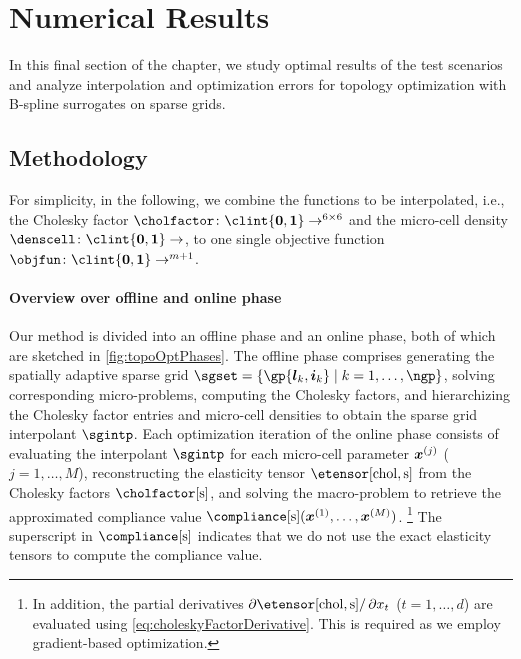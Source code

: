 \section{Numerical Results}
\label{sec:64results}


\noindent
In this final section of the chapter,
we study optimal results of the test scenarios and
analyze interpolation and optimization errors
for topology optimization with B-spline surrogates on sparse grids.



\subsection{Methodology}
\label{sec:641methodology}

For simplicity, in the following,
we combine the functions to be interpolated,
i.e., the Cholesky factor
$\cholfactor\colon \clint{\*0, \*1} \to \real^{6 \times 6}$ and
the micro-cell density $\denscell\colon \clint{\*0, \*1} \to \real$,
to one single objective function
$\*\objfun\colon \clint{\*0, \*1} \to \real^{m+1}$.

\paragraph{Overview over offline and online phase}

Our method is divided into an offline phase and an online phase,
both of which are sketched in \cref{fig:topoOptPhases}.
The offline phase comprises
generating the spatially adaptive sparse grid
$\sgset = \{\gp{\*l_k,\*i_k} \mid k = 1, \dotsc, \ngp\}$,
solving corresponding micro-problems,
computing the Cholesky factors, and
hierarchizing the Cholesky factor entries and micro-cell densities
to obtain the sparse grid interpolant $\*\sgintp$.
Each optimization iteration of the online phase consists of
evaluating the interpolant $\*\sgintp$
for each micro-cell parameter ${\boldsymbol{x}}^{(j)}$ ($j = 1, \dotsc, M$),
reconstructing the elasticity tensor $\etensor[\chol,\sparse]$ from
the Cholesky factors $\cholfactor[\sparse]$, and
solving the macro-problem to retrieve the approximated compliance value
$\compliance[\sparse](\*x^{(1)}, \dotsc, \*x^{(M)})$.%
\footnote{%
  In addition, the partial derivatives
  $\partialdiff{} \etensor[\chol,\sparse]/\partialdiff{} x_t$
  ($t = 1, \dotsc, d$)
  are evaluated using \cref{eq:choleskyFactorDerivative}.
  This is required as we employ gradient-based optimization.%
}
The superscript in $\compliance[\sparse]$ indicates that
we do not use the exact elasticity tensors to compute the compliance value.

